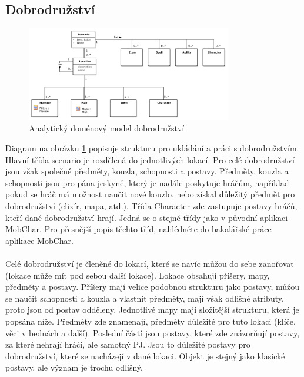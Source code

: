 \documentclass[thesis=B,czech]{resources/FITthesis}[2012/06/26]
\begin{document}
\subsection{Dobrodružství}
\begin{figure}\centering
	\includegraphics[width=0.8\textwidth]{images/domain_scenario}
	\caption[Analytický doménový model dobrodružství]{Analytický doménový model dobrodružství}\label{fig:dm_scenario}
\end{figure}
Diagram na obrázku \ref{fig:dm_scenario} popisuje strukturu pro ukládání a práci s dobrodružstvím. Hlavní třída scenario je rozdělená do jednotlivých lokací. Pro celé dobrodružství jsou však společné předměty, kouzla, schopnosti a postavy. Předměty, kouzla a schopnosti jsou pro pána jeskyně, který je nadále poskytuje hráčům, například pokud se hráč má možnost naučit nové kouzlo, nebo získal důležitý předmět pro dobrodružství (elixír, mapa, atd.). Třída Character zde zastupuje postavy hráčů, kteří dané dobrodružství hrají. Jedná se o stejné třídy jako v původní aplikaci MobChar. Pro přesnější popis těchto tříd, nahlédněte do bakalářské práce aplikace MobChar.\\
\\
Celé dobrodružství je členěné do lokací, které se navíc můžou do sebe zanořovat (lokace může mít pod sebou další lokace). Lokace obsahují příšery, mapy, předměty a postavy. Příšery mají velice podobnou strukturu jako postavy, můžou se naučit schopnosti a kouzla a vlastnit předměty, mají však odlišné atributy, proto jsou od postav odděleny. Jednotlivé mapy mají složitější strukturu, která je popsána níže. Předměty zde znamenají, předměty důležité pro tuto lokaci (klíče, věci v bednách a další). Poslední částí jsou postavy, které zde znázorňují postavy, za které nehrají hráči, ale samotný PJ. Jsou to důležité postavy pro dobrodružství, které se nacházejí v dané lokaci. Objekt je stejný jako klasické postavy, ale význam je trochu odlišný.
\end{document}
